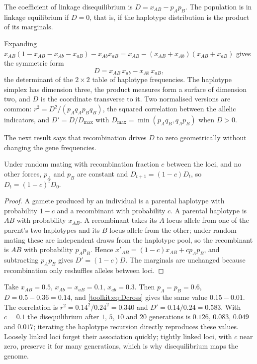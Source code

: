 \begin{definition}\label{toolkit:def:ld}
The coefficient of linkage disequilibrium is $D=x_{AB}-p_Ap_B$. The population is in linkage
equilibrium if $D=0$, that is, if the haplotype distribution is the product of its marginals.
\end{definition}

Expanding $x_{AB}(1-x_{AB}-x_{Ab}-x_{aB})-x_{Ab}x_{aB}=x_{AB}-(x_{AB}+x_{Ab})(x_{AB}+x_{aB})$
gives the symmetric form
\begin{equation}\label{toolkit:eq:Dcross}
D=x_{AB}\,x_{ab}-x_{Ab}\,x_{aB},
\end{equation}
the determinant of the $2\times2$ table of haplotype frequencies. The haplotype simplex has
dimension three, the product measures form a surface of dimension two, and $D$ is the
coordinate transverse to it. Two normalised versions are common: $r^2=D^2/(p_Aq_Ap_Bq_B)$, the
squared correlation between the allelic indicators, and $D'=D/D_{\max}$ with
$D_{\max}=\min(p_Aq_B,q_Ap_B)$ when $D>0$.

The next result says that recombination drives $D$ to zero geometrically without changing the
gene frequencies.

\begin{proposition}\label{toolkit:prop:ldecay}
Under random mating with recombination fraction $c$ between the loci, and no other forces,
$p_A$ and $p_B$ are constant and $D_{t+1}=(1-c)D_t$, so $D_t=(1-c)^tD_0$.
\end{proposition}

\begin{proof}
A gamete produced by an individual is a parental haplotype with probability $1-c$ and a
recombinant with probability $c$. A parental haplotype is $AB$ with probability $x_{AB}$. A
recombinant takes its $A$ locus allele from one of the parent's two haplotypes and its $B$ locus
allele from the other; under random mating these are independent draws from the haplotype pool,
so the recombinant is $AB$ with probability $p_Ap_B$. Hence $x'_{AB}=(1-c)x_{AB}+cp_Ap_B$, and
subtracting $p_Ap_B$ gives $D'=(1-c)D$. The marginals are unchanged because recombination only
reshuffles alleles between loci.
\end{proof}

\begin{example}\label{toolkit:ex:ld}
Take $x_{AB}=0.5$, $x_{Ab}=x_{aB}=0.1$, $x_{ab}=0.3$. Then $p_A=p_B=0.6$, $D=0.5-0.36=0.14$, and
\eqref{toolkit:eq:Dcross} gives the same value $0.15-0.01$. The correlation is
$r^2=0.14^2/0.24^2=0.340$ and $D'=0.14/0.24=0.583$. With $c=0.1$ the disequilibrium after $1$,
$5$, $10$ and $20$ generations is $0.126$, $0.083$, $0.049$ and $0.017$; iterating the haplotype
recursion directly reproduces these values. Loosely linked loci forget their association quickly;
tightly linked loci, with $c$ near zero, preserve it for many generations, which is why
disequilibrium maps the genome.
\end{example}

